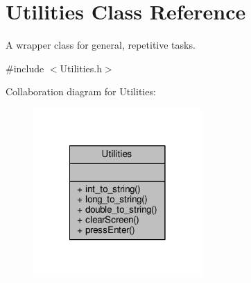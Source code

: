 \hypertarget{classUtilities}{\section{Utilities Class Reference}
\label{classUtilities}
}


A wrapper class for general, repetitive tasks.  




{\ttfamily \#include $<$Utilities.\-h$>$}



Collaboration diagram for Utilities\-:
\nopagebreak
\begin{figure}[H]
\begin{center}
\leavevmode
\includegraphics[width=182pt]{classUtilities__coll__graph}
\end{center}
\end{figure}
